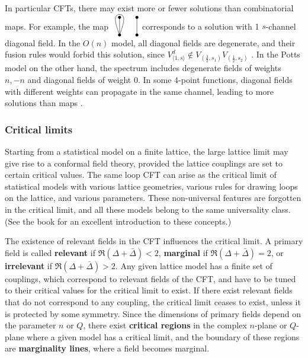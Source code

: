 \documentclass[12pt, a4paper]{article}
\newcommand{\myindex}[1]{\textbf{\boldmath #1}}
\newcommand{\vertices}{
\coordinate (base) at (0, 1);
\draw (0, 0) node[fill, circle, minimum size = 1.3mm, inner sep = 0]{};
  \draw (3, 0) node[fill, circle, minimum size = 1.3mm, inner sep = 0]{};
  \draw (0, 3) node[fill, circle, minimum size = 1.3mm, inner sep = 0]{};
  \draw (3, 3) node[fill, circle, minimum size = 1.3mm, inner sep = 0]{};
}
\theoremstyle{break}
\begin{document}
In particular CFTs, there may exist more or fewer solutions than combinatorial maps. 
For example, the map 
$
\begin{tikzpicture}[baseline=(base), scale = .25]
 \vertices
  \draw (0, 0) -- (0, 3);
  \draw (3, 0) -- (3, 3);
  \draw (0, 0) to [out = 70, in = 0] (0, 3.5) to [out = 180, in = 110] (0, 0);
 \end{tikzpicture}
 $
corresponds to a solution with 1 $s$-channel diagonal field.
 In the $O(n)$ model, all diagonal fields are degenerate, and their fusion rules would forbid this solution, since $V^d_{\langle 1,s\rangle}\notin V_{(\frac32,s_1)}V_{(\frac12,s_2)}$ \cite{gnjrs21}. In the Potts model on the other hand, the spectrum includes degenerate fields of weights $n,-n$ and diagonal fields of weight $0$. In some 4-point functions, diagonal fields with different weights can propagate in the same channel, leading to more solutions than maps \cite{niv22}. 
 
\subsubsection{Critical limits}

Starting from a statistical model on a finite lattice, the large lattice limit may give rise to a conformal field theory, provided the lattice couplings are set to certain critical values. The same loop CFT can arise as the critical limit of statistical models with various lattice geometries, various rules for drawing loops on the lattice, and various parameters. These non-universal features are forgotten in the critical limit, and all these models belong to the same universality class. (See the book \cite{car96} for an excellent introduction to these concepts.) 

The existence of relevant fields in the CFT influences the critical limit. A primary field is called \myindex{relevant} if $\Re(\Delta+\bar\Delta)<2$, \myindex{marginal} if $\Re(\Delta+\bar\Delta)=2$, or \myindex{irrelevant} if $\Re(\Delta+\bar\Delta)>2$. 
Any given lattice model has a finite set of couplings, which correspond to relevant fields of the CFT, and have to be tuned to their critical values for the critical limit to exist. If there exist relevant fields that do not correspond to any coupling, the critical limit ceases to exist, unless it is protected by some symmetry. Since the 
dimensions of primary fields depend on the parameter $n$ or $Q$, there exist \myindex{critical regions} in the complex $n$-plane or $Q$-plane where a given model has a critical limit, and the boundary of these regions are \myindex{marginality lines}, where a field becomes marginal. 
\end{document}
